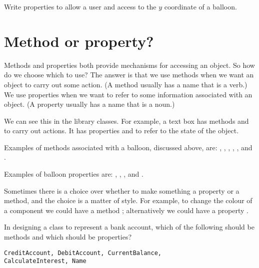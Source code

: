 		\begin{stqb}
			\begin{STQ}
				\item Write properties to allow a user  and  access to the $y$ coordinate of a balloon.
			\end{STQ}
		\end{stqb}


	\section{Method or property?}
		Methods and properties both provide mechanisms for accessing an object. So how do we choose which to use? The answer is that we use methods when we want an object to carry out some action. (A method usually has a name that is a verb.) We use properties when we want to refer to some information associated with an object. (A property usually has a name that is a noun.)

		We can see this in the library classes. For example, a text box has methods  and  to carry out actions. It has properties  and  to refer to the state of the object.

		Examples of methods associated with a balloon, discussed above, are: , , , , ,  and \keyword{Grow}.

		Examples of balloon properties are: , , ,  and \keyword{Visible}.

		Sometimes there is a choice over whether to make something a property or a method, and the choice is a matter of style. For example, to change the colour of a component we could have a method ; alternatively we could have a property \keyword{Colour}.

		\begin{stqb}
			\begin{STQ}
				\item In designing a class  to represent a bank account, which of the following should be methods and which should be properties?
					\begin{lstlisting}
CreditAccount, DebitAccount, CurrentBalance,
CalculateInterest, Name
					\end{lstlisting}
			\end{STQ}
		\end{stqb}


